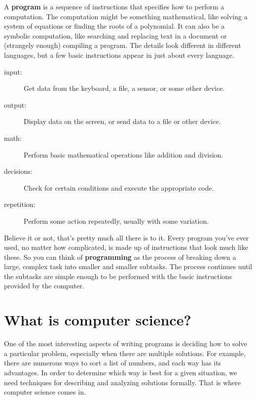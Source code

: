 \documentclass[12pt]{book}
\theoremstyle{exercise}
\begin{document}
A {\bf program} is a sequence of instructions that specifies how to perform a computation.
The computation might be something mathematical, like solving a system of equations or finding the roots of a polynomial.
It can also be a symbolic computation, like searching and replacing text in a document or (strangely enough) compiling a program.
The details look different in different languages, but a few basic instructions appear in just about every language.

\begin{description}
\item[input:] Get data from the keyboard, a file, a sensor, or some other device.
\item[output:] Display data on the screen, or send data to a file or other device.
\item[math:] Perform basic mathematical operations like addition and division.
\item[decisions:] Check for certain conditions and execute the appropriate code.
\item[repetition:] Perform some action repeatedly, usually with some variation.
\end{description}


Believe it or not, that's pretty much all there is to it.
Every program you've ever used, no matter how complicated, is made up of instructions that look much like these.
So you can think of {\bf programming} as the process of breaking down a large, complex task into smaller and smaller subtasks.
The process continues until the subtasks are simple enough to be performed with the basic instructions provided by the computer.


\section{What is computer science?}

One of the most interesting aspects of writing programs is deciding how to solve a particular problem, especially when there are multiple solutions.
For example, there are numerous ways to sort a list of numbers, and each way has its advantages.
In order to determine which way is best for a given situation, we need techniques for describing and analyzing solutions formally.
That is where computer science comes in.
\end{document}
